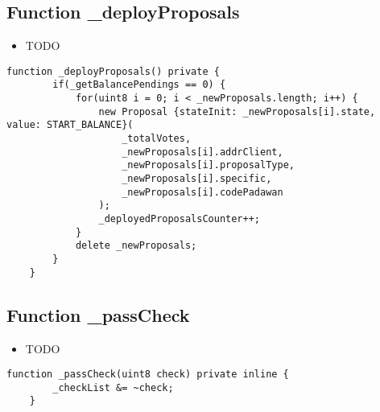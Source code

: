 \subsection{Function \_{}deployProposals}

\begin{itemize}
\item TODO
\end{itemize}

\begin{lstlisting}[firstnumber=156]
    function _deployProposals() private {
        if(_getBalancePendings == 0) {
            for(uint8 i = 0; i < _newProposals.length; i++) {
                new Proposal {stateInit: _newProposals[i].state, value: START_BALANCE}(
                    _totalVotes,
                    _newProposals[i].addrClient,
                    _newProposals[i].proposalType,
                    _newProposals[i].specific,
                    _newProposals[i].codePadawan
                );
                _deployedProposalsCounter++;
            }
            delete _newProposals;
        }
    }
\end{lstlisting}

\subsection{Function \_{}passCheck}

\begin{itemize}
\item TODO
\end{itemize}

\begin{lstlisting}[firstnumber=58]
    function _passCheck(uint8 check) private inline {
        _checkList &= ~check;
    }
\end{lstlisting}
